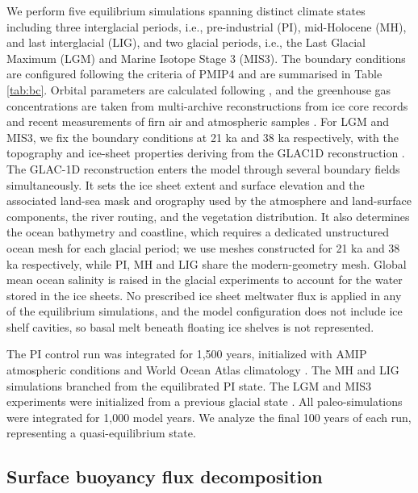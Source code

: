 \documentclass[pdflatex,sn-nature]{sn-jnl}
\begin{document}
We perform five equilibrium simulations spanning distinct climate states including three interglacial periods, i.e., pre-industrial (PI), mid-Holocene (MH), and last interglacial (LIG), and two glacial periods, i.e., the Last Glacial Maximum (LGM) and Marine Isotope Stage 3 (MIS3). The boundary conditions are configured following the criteria of PMIP4 \cite{otto2017pmip4} and are summarised in Table \ref{tab:bc}. Orbital parameters are calculated following \cite{berger1977long}, and the greenhouse gas concentrations are taken from multi-archive reconstructions from ice core records and recent measurements of firn air and atmospheric samples \cite{fluckiger2002high,monnin2004evidence,schilt2010glacial,buiron2011taldice,schneider2013reconstruction,kohler2017156}.  For LGM and MIS3, we fix the boundary conditions at 21 ka and 38 ka respectively, with the topography and ice-sheet properties deriving from the GLAC1D reconstruction \cite{tarasov2003greenland,tarasov2012data,briggs2014data}. The GLAC-1D reconstruction enters the model through several boundary fields simultaneously. It sets the ice sheet extent and surface elevation and the associated land-sea mask and orography used by the atmosphere and land-surface components, the river routing, and the vegetation distribution. It also determines the ocean bathymetry and coastline, which requires a dedicated unstructured ocean mesh for each glacial period; we use meshes constructed for 21 ka and 38 ka respectively, while PI, MH and LIG share the modern-geometry mesh. Global mean ocean salinity is raised in the glacial experiments to account for the water stored in the ice sheets. No prescribed ice sheet meltwater flux is applied in any of the equilibrium simulations, and the model configuration does not include ice shelf cavities, so basal melt beneath floating ice shelves is not represented.

The PI control run was integrated for 1,500 years, initialized with AMIP atmospheric conditions \cite{roeckner2004atmospheric} and World Ocean Atlas climatology \cite{levitus2010world}. The MH and LIG simulations branched from the equilibrated PI state. The LGM and MIS3 experiments were initialized from a previous glacial state \cite{werner2016glacial}. All paleo-simulations were integrated for 1,000 model years. We analyze the final 100 years of each run, representing a quasi-equilibrium state.


\subsection{Surface buoyancy flux decomposition}
\end{document}
